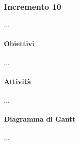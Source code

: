 \subsubsection{Incremento 10}
...
\paragraph{Obiettivi}
...
\paragraph{Attività}
...
\paragraph{Diagramma di Gantt}
...


